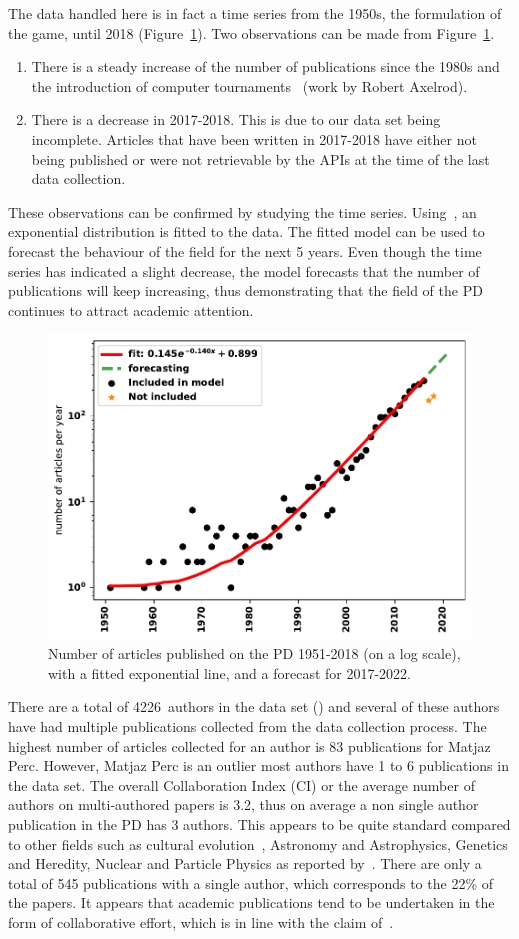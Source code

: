 \documentclass{article}
\theoremstyle{definition}
\newcommand{\authors}{4226}
\begin{document}
The data handled here is in fact a time series from the 1950s, the formulation
of the game, until 2018 (Figure~\ref{fig:timeseries}). Two observations can be
made from Figure~\ref{fig:timeseries}.

\begin{enumerate}
    \item There is a steady increase of the number of publications since the
    1980s and the introduction of computer tournaments~\cite{Axelrod1981}
    (work by Robert Axelrod).
    \item There is a decrease in 2017-2018. This is due to our data set being
    incomplete. Articles that have been written in 2017-2018 have either not
    being published or were not retrievable by the APIs at the time of the last
    data collection.
\end{enumerate}

These observations can be confirmed by studying the time series.
Using~\cite{scipy}, an exponential distribution is fitted to the data.
The fitted model can be used to forecast the
behaviour of the field for the next 5 years. Even
though the time series has indicated a slight decrease, the model forecasts that
the number of publications will keep increasing, thus demonstrating that the
field of the PD continues to attract academic attention.

\begin{figure}[!hbtp]
    \centering
    \includegraphics[width=.50\textwidth]{forecasting.pdf}
    \caption{Number of articles published on the PD 1951-2018 (on a log scale),
    with a fitted exponential line, and a forecast for 2017-2022.}\label{fig:timeseries}
\end{figure}

There are a total of \authors~authors in the data set (\cite{pd_data_2018}) and several of these
authors have had multiple publications collected from the data collection process.
The highest number of articles collected for an
author is 83 publications for Matjaz Perc. However, Matjaz Perc is an outlier
most authors have 1 to 6 publications in the data set.
The overall Collaboration Index (CI) or the average number of authors on
multi-authored papers is 3.2, thus on average a non single author publication in
the PD has 3 authors. This appears to be quite standard compared to other fields
such as cultural evolution~\cite{youngblood2018}, Astronomy and Astrophysics,
Genetics and Heredity, Nuclear and Particle Physics as reported
by~\cite{nature_author_blog}.
There are only a total of 545 publications with a single author, which
corresponds to the 22\% of the papers. It appears that academic publications
tend to be undertaken in the form of collaborative effort, which is in line
with the claim of~\cite{Kyvik2017}.
\end{document}
